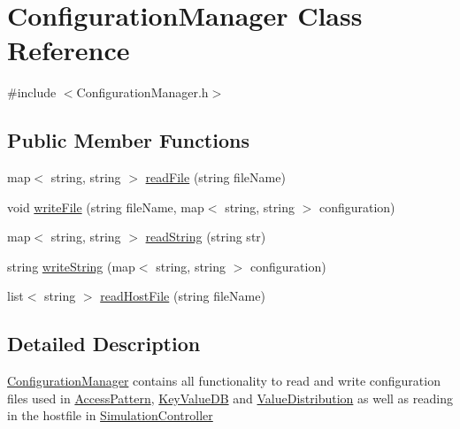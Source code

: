 \hypertarget{classConfigurationManager}{
\section{ConfigurationManager Class Reference}
\label{classConfigurationManager}
}


{\ttfamily \#include $<$ConfigurationManager.h$>$}\subsection*{Public Member Functions}
\begin{DoxyCompactItemize}
\item 
map$<$ string, string $>$ \hyperlink{classConfigurationManager_a1c4ee8379e2ccee2a2ac76b92042daba}{readFile} (string fileName)
\item 
void \hyperlink{classConfigurationManager_a078649c42cbc46e6fbdf7b7a74183898}{writeFile} (string fileName, map$<$ string, string $>$ configuration)
\item 
map$<$ string, string $>$ \hyperlink{classConfigurationManager_aed48081116dc9181acb904ac18a52eb5}{readString} (string str)
\item 
string \hyperlink{classConfigurationManager_a4dfba4665ffb818e21363f446a6cde12}{writeString} (map$<$ string, string $>$ configuration)
\item 
list$<$ string $>$ \hyperlink{classConfigurationManager_adba6ce19eaf7b98ba158011f4bb71eea}{readHostFile} (string fileName)
\end{DoxyCompactItemize}


\subsection{Detailed Description}
\hyperlink{classConfigurationManager}{ConfigurationManager} contains all functionality to read and write configuration files used in \hyperlink{classAccessPattern}{AccessPattern}, \hyperlink{classKeyValueDB}{KeyValueDB} and \hyperlink{classValueDistribution}{ValueDistribution} as well as reading in the hostfile in \hyperlink{classSimulationController}{SimulationController} 

